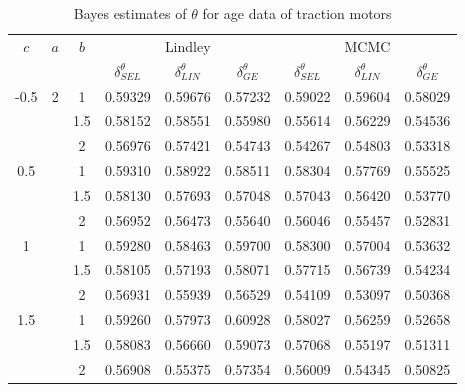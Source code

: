\documentclass[11pt,a4paper]{article}
\numberwithin{equation}{section}
\begin{document}
	\begin{table}[htbp]

		\centering

		\caption{Bayes estimates of $\theta$ for age data of traction motors}

		\begin{tabular}{c|c|c|ccc|ccc}

			\toprule

			\multirow{2}[3]{*}{$c$} & \multirow{2}[3]{*}{$a$} & \multirow{2}[3]{*}{$b$} & \multicolumn{3}{c|}{Lindley} & \multicolumn{3}{c}{MCMC} \\

			\cmidrule{4-9}          &       &       & $\delta^\theta_{SEL}$ & $\delta^\theta_{LIN}$ & $\delta^\theta_{GE}$ & $\delta^\theta_{SEL}$ & $\delta^\theta_{LIN}$ & $\delta^\theta_{GE}$ \\ \midrule

			\multirow{3}[0]{*}{-0.5} & \multirow{12}[1]{*}{2} & 1     & 0.59329 & 0.59676 & 0.57232 & 0.59022 & 0.59604 & 0.58029 \\

			&       & 1.5   & 0.58152 & 0.58551 & 0.55980 & 0.55614 & 0.56229 & 0.54536 \\

			&       & 2     & 0.56976 & 0.57421 & 0.54743 & 0.54267 & 0.54803 & 0.53318 \\

			\multirow{3}[0]{*}{0.5} &       & 1     & 0.59310 & 0.58922 & 0.58511 & 0.58304 & 0.57769 & 0.55525 \\

			&       & 1.5   & 0.58130 & 0.57693 & 0.57048 & 0.57043 & 0.56420 & 0.53770 \\

			&       & 2     & 0.56952 & 0.56473 & 0.55640 & 0.56046 & 0.55457 & 0.52831 \\

			\multirow{3}[0]{*}{1} &       & 1     & 0.59280 & 0.58463 & 0.59700 & 0.58300 & 0.57004 & 0.53632 \\

			&       & 1.5   & 0.58105 & 0.57193 & 0.58071 & 0.57715 & 0.56739 & 0.54234 \\

			&       & 2     & 0.56931 & 0.55939 & 0.56529 & 0.54109 & 0.53097 & 0.50368 \\

			\multirow{3}[1]{*}{1.5} &       & 1     & 0.59260 & 0.57973 & 0.60928 & 0.58027 & 0.56259 & 0.52658 \\

			&       & 1.5   & 0.58083 & 0.56660 & 0.59073 & 0.57068 & 0.55197 & 0.51311 \\

			&       & 2     & 0.56908 & 0.55375 & 0.57354 & 0.56009 & 0.54345 & 0.50825 \\

			\bottomrule

		\end{tabular}%

		\label{tab:age_data}%

	\end{table}%
\end{document}
